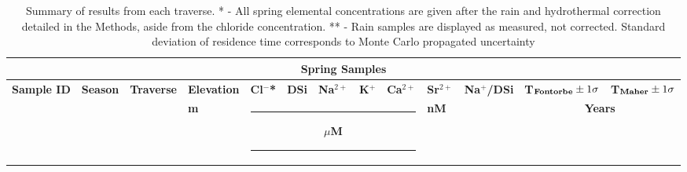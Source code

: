 \begin{landscape}


    {\footnotesize
\begin{longtable}{l l l l l l l l l l l l l}

    \caption{Summary of results from each traverse. * - All spring elemental concentrations are given after the rain and hydrothermal correction detailed in the Methods, aside from the chloride concentration. ** - Rain samples are displayed as measured, not corrected. Standard deviation of residence time corresponds to Monte Carlo propagated uncertainty} 
    \label{tab:results_table} \\

    
    \hline
    \multicolumn{13}{c}{\textbf{Spring Samples}} \\
    \hline
    \textbf{Sample ID}  &  \textbf{Season}  &  \textbf{Traverse}  &  \textbf{Elevation}  &  \textbf{Cl$^-$*}  &  \textbf{DSi}  &  \textbf{Na$^{2+}$}  &  \textbf{K$^{+}$}  &  \textbf{Ca$^{2+}$}  &  \textbf{Sr$^{2+}$}  &  \textbf{Na$^{+}$/DSi}  &  \textbf{T$_{\text{\textbf{Fontorbe}}} \pm 1\sigma$ }  &  \textbf{T$_{\text{\textbf{Maher}}} \pm 1\sigma$} \\
    \hline
      &   &   &  \textbf{m}  &  \multicolumn{5}{c}{\hspace{-0.35cm}\rule{2.5cm}{0.8pt} \hspace{0.3cm}\textbf{ $\mu$M } \hspace{0.3cm} \rule{2.5cm}{0.8pt}} & \multicolumn{1}{l}{\textbf{nM}} &  &  \multicolumn{2}{c}{\textbf{Years}} \\
    \hline
    \endfirsthead
    

\end{longtable}}
\end{landscape}
